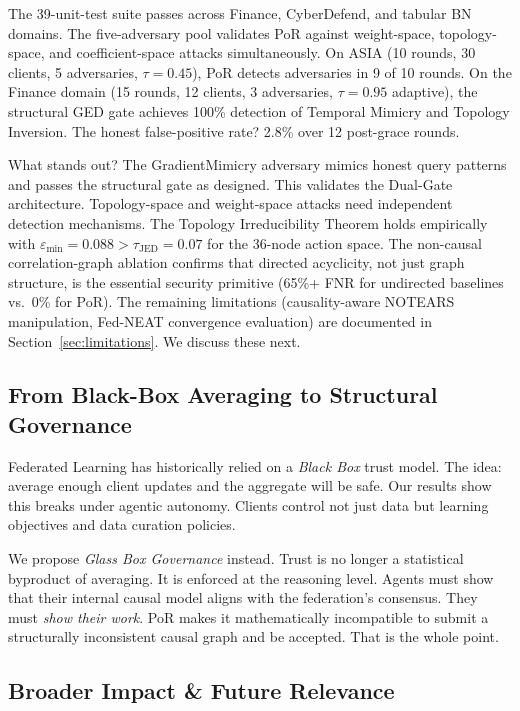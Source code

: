 \documentclass[journal]{IEEEtran}
\begin{document}
The 39-unit-test suite passes across Finance, CyberDefend, and tabular BN domains. The five-adversary pool validates PoR against weight-space, topology-space, and coefficient-space attacks simultaneously. On ASIA (10 rounds, 30 clients, 5 adversaries, $\tau=0.45$), PoR detects adversaries in 9 of 10 rounds. On the Finance domain (15 rounds, 12 clients, 3 adversaries, $\tau=0.95$ adaptive), the structural GED gate achieves 100\% detection of Temporal Mimicry and Topology Inversion. The honest false-positive rate? 2.8\% over 12 post-grace rounds.

What stands out? The GradientMimicry adversary mimics honest query patterns and passes the structural gate as designed. This validates the Dual-Gate architecture. Topology-space and weight-space attacks need independent detection mechanisms. The Topology Irreducibility Theorem holds empirically with $\varepsilon_{\min}=0.088 > \tau_{\text{JED}}=0.07$ for the 36-node action space. The non-causal correlation-graph ablation confirms that directed acyclicity, not just graph structure, is the essential security primitive (65\%+ FNR for undirected baselines vs.\ 0\% for PoR). The remaining limitations (causality-aware NOTEARS manipulation, Fed-NEAT convergence evaluation) are documented in Section~\ref{sec:limitations}. We discuss these next.

\subsection{From Black-Box Averaging to Structural Governance}

Federated Learning has historically relied on a \emph{Black Box} trust model. The idea: average enough client updates and the aggregate will be safe. Our results show this breaks under agentic autonomy. Clients control not just data but learning objectives and data curation policies.

We propose \emph{Glass Box Governance} instead. Trust is no longer a statistical byproduct of averaging. It is enforced at the reasoning level. Agents must show that their internal causal model aligns with the federation's consensus. They must \emph{show their work}. PoR makes it mathematically incompatible to submit a structurally inconsistent causal graph and be accepted. That is the whole point.

\subsection{Broader Impact \& Future Relevance}
\end{document}
